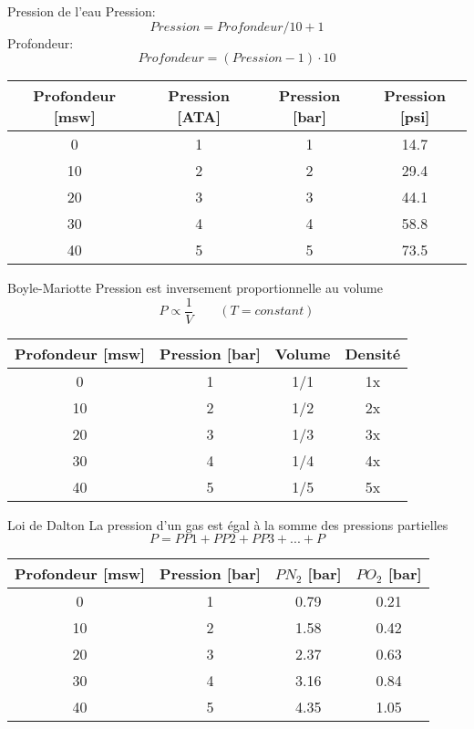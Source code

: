 \begin{frame}{Pression de l'eau}  
	Pression:
	\[  Pression = Profondeur/10 + 1 \]
	Profondeur:
	\[  Profondeur = (Pression-1) \cdot 10 \]
	\vfill
	\centering
	\begin{tabular}{|c|c|c|c|}
		\hline
		Profondeur [msw] 	&	Pression [ATA]	& Pression [bar]	& Pression [psi] \\
		\hline
		0	& 1	& 1 	& 14.7 \\
		10	& 2	& 2	& 29.4 \\
		20	& 3	& 3	& 44.1 \\
		30	& 4	& 4	& 58.8 \\
		40	& 5	& 5	& 73.5 \\
		\hline
	\end{tabular}
\end{frame}

\begin{frame}{Boyle-Mariotte}
	Pression est inversement proportionnelle au volume
	\[ \boxed{P \propto \frac{1}{V} \qquad (T=constant)} \]
	\vfill
	\centering
	\begin{tabular}{|c|c|c|c|}
		\hline
		Profondeur [msw] 	&	Pression [bar]	& Volume & Densité \\
		\hline
		0	& 1	& 1/1	& 1x \\
		10	& 2	& 1/2	& 2x \\
		20	& 3	& 1/3	& 3x \\
		30	& 4	& 1/4	& 4x \\
		40	& 5	& 1/5	& 5x \\
		\hline
	\end{tabular}
\end{frame}

\begin{frame}{Loi de Dalton}
	La pression d'un gas est égal à la somme des pressions partielles\\
	\[\boxed{P = PP1 + PP2 + PP3 +...+P}\]
	\vfill
	\centering
	\begin{tabular}{|c|c|c|c|}
		\hline
		Profondeur [msw] 	&	Pression [bar]	& $PN_2$ [bar] & $PO_2$ [bar] \\
		\hline
		0		& 1	& 0.79	& 0.21 \\
		10		& 2	& 1.58	& 0.42 \\
		20		& 3	& 2.37	& 0.63 \\
		30		& 4	& 3.16	& 0.84 \\
		40		& 5	& 4.35	& 1.05 \\
		\hline
	\end{tabular}
\end{frame}

